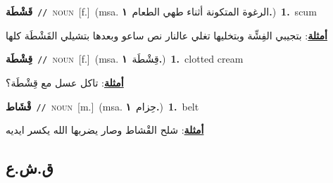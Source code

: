 \documentclass[10pt,a4paper,twoside]{article} %
\begin{document}
\begin{multicols}{2}
{\setlength\topsep{0pt}\textbf{\foreignlanguage{arabic}{قَشْطَة}}\ {\color{gray}\texttt{//}\color{black}}\ \textsc{noun}\ [f.]\ \color{gray}(msa. \foreignlanguage{arabic}{الرغوة المتكونة أثناء طهي الطعام}~\foreignlanguage{arabic}{\textbf{١.}})\color{black}\ \textbf{1.}~scum\  \begin{flushright}\color{gray}\foreignlanguage{arabic}{\textbf{\underline{\foreignlanguage{arabic}{أمثلة}}}: بتجيبي الفِشِّة وبتخليها تغلي عالنار نص ساعو وبعدها بتشيلي القَشْطَة كلها}\end{flushright}\color{black}} \vspace{2mm}

{\setlength\topsep{0pt}\textbf{\foreignlanguage{arabic}{قِشْطَة}}\ {\color{gray}\texttt{//}\color{black}}\ \textsc{noun}\ [f.]\ \color{gray}(msa. \foreignlanguage{arabic}{قِشْطَة}~\foreignlanguage{arabic}{\textbf{١.}})\color{black}\ \textbf{1.}~clotted cream\  \begin{flushright}\color{gray}\foreignlanguage{arabic}{\textbf{\underline{\foreignlanguage{arabic}{أمثلة}}}: تاكل عسل مع قِشْطَة؟}\end{flushright}\color{black}} \vspace{2mm}

{\setlength\topsep{0pt}\textbf{\foreignlanguage{arabic}{قْشَاط}}\ {\color{gray}\texttt{//}\color{black}}\ \textsc{noun}\ [m.]\ \color{gray}(msa. \foreignlanguage{arabic}{حِزام}~\foreignlanguage{arabic}{\textbf{١.}})\color{black}\ \textbf{1.}~belt\  \begin{flushright}\color{gray}\foreignlanguage{arabic}{\textbf{\underline{\foreignlanguage{arabic}{أمثلة}}}: شلح القْشاط وصار يضربها الله يكسر ايديه}\end{flushright}\color{black}} \vspace{2mm}

\vspace{-3mm}
\subsection*{\color{blue}\foreignlanguage{arabic}{ق.ش.ع}\color{blue}{}} 


\end{multicols}
\end{document}
